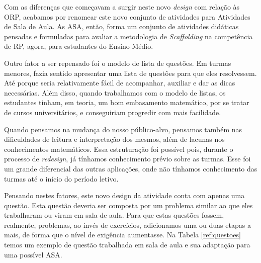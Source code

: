 Com as diferenças que começavam a surgir neste novo \textit{design} com relação às ORP, acabamos por renomear este novo conjunto de atividades para Atividades de Sala de Aula. As ASA, então, forma um conjunto de atividades didáticas pensadas e formuladas para avaliar a metodologia de \textit{Scaffolding} na competência de RP, agora, para estudantes do Ensino Médio.

Outro fator a ser repensado foi o modelo de lista de questões. Em turmas menores, fazia sentido apresentar uma lista de questões para que eles resolvessem. Até porque seria relativamente fácil de acompanhar, auxiliar e dar as dicas necessárias. Além disso, quando trabalhamos com o modelo de listas, os estudantes tinham, em teoria, um bom embasamento matemático, por se tratar de cursos universitários, e conseguiriam progredir com mais facilidade. 

Quando pensamos na mudança do nosso público-alvo, pensamos também nas dificuldades de leitura e interpretação dos mesmos, além de lacunas nos conhecimentos matemáticos. Essa estruturação foi possível pois, durante o processo de \textit{redesign}, já tínhamos conhecimento prévio sobre as turmas. Esse foi um grande diferencial das outras aplicações, onde não tínhamos conhecimento das turmas até o início do período letivo.

Pensando nestes fatores, este novo design da atividade conta com apenas uma questão. Esta questão deveria ser composta por um problema similar ao que eles trabalharam ou viram em sala de aula. Para que estas questões fossem, realmente, problemas, ao invés de exercícios, adicionamos uma ou duas etapas a mais, de forma que o nível de exigência aumentasse. Na Tabela \ref{ref:questoes} temos um exemplo de questão trabalhada em sala de aula e sua adaptação para uma possível ASA.  

